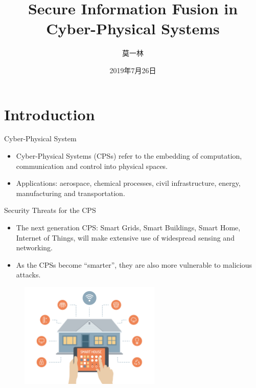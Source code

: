 \documentclass[10pt]{beamer}
\title[Secure Info Fusion]{Secure Information Fusion in Cyber-Physical Systems}
\author[Yilin Mo]{莫一林}
\institute[Tsinghua]{清华大学    自动化系}
\date[July 26, 2019]{2019年7月26日}
\begin{document}
\maketitle 

\section{Introduction}

\begin{frame}{Cyber-Physical System}
  \begin{itemize}
  \item Cyber-Physical Systems (CPSs) refer to the embedding of computation, communication and control into physical spaces.
    \begin{center}
    \end{center}
  \item Applications: aerospace, chemical processes, civil infrastructure, energy, manufacturing and transportation. 
  \end{itemize}
\end{frame}

\begin{frame}{Security Threats for the CPS}
  \begin{itemize}
  \item The next generation CPS: Smart Grids, Smart Buildings, Smart Home, Internet of Things, will make extensive use of widespread sensing and networking.
  \item As the CPSs become ``smarter'', they are also more vulnerable to malicious attacks.
  \end{itemize}
  \begin{figure}[ht]
    \centering
    \includegraphics[width=0.6\textwidth]{SmartHome.jpg}
  \end{figure}
\end{frame}
\end{document}

